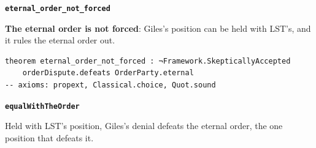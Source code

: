 \documentclass[11pt,paper=\testimonypaper,DIV=13,parskip=false]{scrartcl}
\begin{document}
\par\medskip\noindent\textbf{\texttt{eternal\_\allowbreak{}order\_\allowbreak{}not\_\allowbreak{}forced}}\par\nobreak\noindent
\textbf{The eternal order is not forced}: Giles’s position can be held with LST’s, and it rules the eternal order out.

{\small\begin{verbatim}
theorem eternal_order_not_forced : ¬Framework.SkepticallyAccepted
    orderDispute.defeats OrderParty.eternal
-- axioms: propext, Classical.choice, Quot.sound
\end{verbatim}}
\par\medskip\noindent\textbf{\texttt{equal\allowbreak{}With\allowbreak{}The\allowbreak{}Order}}\par\nobreak\noindent
Held with LST’s position, Giles’s denial defeats the eternal order, the one position that defeats it.
\end{document}
